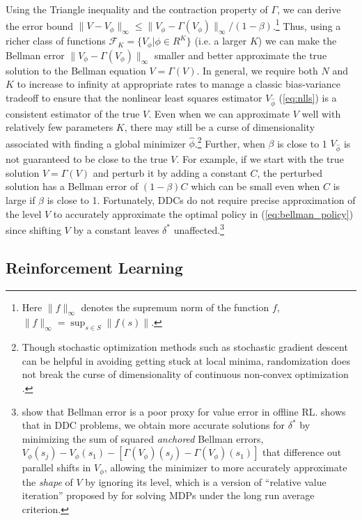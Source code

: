 Using the Triangle inequality and the contraction property of $\Gamma$, we can derive the error bound
$\|V-V_\phi\|_\infty \le \| V_\phi-\Gamma(V_\phi)\|_\infty/(1-\beta)$.\footnote{\footnotesize Here $\|f\|_\infty$
denotes the supremum norm of the function $f$, $\|f\|_\infty=\sup_{s \in S}\|f(s)\|$.} Thus, using a richer class of functions 
$\mathcal{F}_K=\{V_\phi|\phi \in R^K\}$ (i.e. a larger $K$) we can make the Bellman error
$\|V_\phi-\Gamma(V_\phi)\|_\infty$ smaller and better approximate the true solution to the Bellman
equation $V=\Gamma(V)$. In general, we require both $N$ and $K$ to increase to infinity at appropriate rates
to manage a classic bias-variance tradeoff to ensure that the nonlinear least squares estimator $V_{\hat\phi}$ (\ref{eq:nlls})
is a consistent estimator of the true $V$. Even when we can approximate $V$ well with relatively few parameters
$K$, there may still be a curse of dimensionality associated with finding a global minimizer $\hat\phi$.\footnote{\footnotesize 
Though stochastic optimization methods such as stochastic gradient descent can be helpful in avoiding getting stuck
at local minima, randomization does not break the curse of dimensionality of continuous non-convex optimization \citep{yn:1976}.}
Further, when $\beta$ is close to 1 $V_{\hat\phi}$ is not guaranteed to be close to the
true $V$. For example, if we start with 
the true solution $V=\Gamma(V)$ and perturb it by adding a constant $C$, the perturbed solution has a Bellman error of
$(1-\beta)C$ which can be small even when $C$ is large if $\beta$ is close to 1.
Fortunately, DDCs do not require
precise approximation of the level $V$ to accurately approximate the optimal policy in  (\ref{eq:bellman_policy}) since shifting $V$
by a constant leaves $\delta^*$ unaffected.\footnote{\footnotesize \citet{fujimoto22a} show that Bellman error is a poor proxy for value error in offline RL. 
\citet{Nguyen:2025} shows that in DDC problems, we obtain
more accurate solutions for $\delta^*$ by minimizing the sum of squared {\it anchored\/} Bellman errors, 
$V_\phi(s_j)-V_\phi(s_1)-[\Gamma(V_\phi)(s_j)-\Gamma(V_\phi)(s_1)]$ that difference out
parallel shifts in $V_\phi$, allowing the minimizer to more accurately approximate the {\it shape\/} of $V$ by ignoring its level, 
which is a version of ``relative value iteration'' proposed by \citet{puterman:1994} for solving MDPs under the long run average criterion.}


\subsection{Reinforcement Learning}
\label{section:rl}

